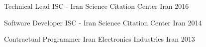 


\begin{cvhonors}


\cvhonor
{Technical Lead} %
{ISC - Iran Science Citation Center} %
{Iran} %
{2016} %
    

\cvhonor
{Software Developer} %
{ISC - Iran Science Citation Center} %
{Iran} %
{2014} %


\cvhonor
{Contractual Programmer} %
{Iran Electronics Industries} %
{Iran} %
{2013} %


\end{cvhonors}